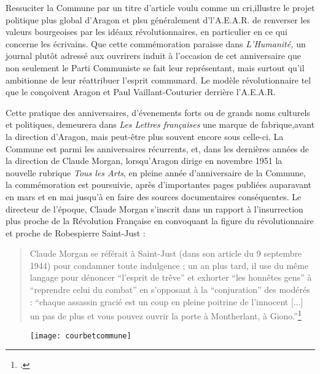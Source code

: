Ressuciter la Commune par un titre d'article voulu comme un cri,illustre le projet politique plus global d'Aragon et plsu généralement d'l'A.E.A.R. de renverser les valeurs bourgeoises par les idéaux révolutionnaires, en particulier en ce qui concerne les écrivains. Que cette commémoration paraisse dans \emph{L'Humanité,} un journal plutôt adressé aux ouvrirers induit à l'occasion de cet anniversaire que non seulement le Parti Communiste se fait leur représentant, mais surtout qu'il ambitionne de leur réattribuer l'esprit communard. Le modèle révolutionnaire tel que le conçoivent Aragon et Paul Vaillant-Couturier derrière l'A.E.A.R. 

Cette pratique des anniversaires, d'évenements forts ou de grands noms culturels et politiques, demeurera dans \emph{Les Lettres françaises} une marque de fabrique,avant la direction d'Aragon, mais peut-être plus souvent encore sous celle-ci. La Commune est parmi les anniversaires récurrents, et, dans les dernières années de la direction de Claude Morgan, lorsqu'Aragon dirige en novembre 1951 la nouvelle rubrique \emph{Tous les Arts}, en pleine année d'anniversaire de la Commune, la commémoration est poursuivie, après d'importantes pages publiées auparavant en mars et en mai jusqu'à en faire des sources documentaires conséquentes. Le directeur de l'époque, Claude Morgan s'inscrit dans un rapport à l'insurrection plus proche de la Révolution Française en convoquant la figure du révolutionnaire et proche de Robespierre Saint-Just :

\begin{quote}
Claude Morgan se référait à Saint-Just (dans son article du 9 septembre 1944) pour condamner toute indulgence ; un an plus tard, il use du même langage pour dénoncer \enquote{l'esprit de trêve} et exhorter \enquote{les honnêtes gens} à \enquote{reprendre celui du combat} en s'opposant à la \enquote{conjuration} des modérés : \enquote{chaque assassin gracié est un coup en pleine poitrine de l'innocent [...] un pas de plus et vous pouvez ouvrir la porte à Montherlant, à Giono.}\footcite[p538]{these}	
\end{quote}

\begin{figure}[H]
   \centering
   \texttt{[image: courbetcommune]}
	\caption{\cite{courbetcommunard}}\label{courbetcommune}
\end{figure}

